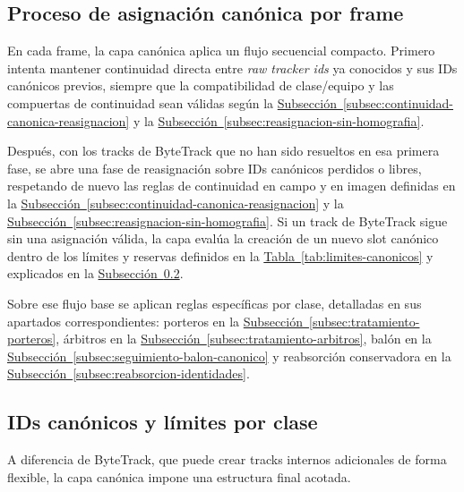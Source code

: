 \subsection{Proceso de asignación canónica por frame}

En cada frame, la capa canónica aplica un flujo secuencial compacto. Primero intenta mantener continuidad directa entre \textit{raw tracker ids} ya conocidos y sus IDs canónicos previos, siempre que la compatibilidad de clase/equipo y las compuertas de continuidad sean válidas según la \hyperref[subsec:continuidad-canonica-reasignacion]{Subsección~\ref*{subsec:continuidad-canonica-reasignacion}} y la \hyperref[subsec:reasignacion-sin-homografia]{Subsección~\ref*{subsec:reasignacion-sin-homografia}}.

Después, con los tracks de ByteTrack que no han sido resueltos en esa primera fase, se abre una fase de reasignación sobre IDs canónicos perdidos o libres, respetando de nuevo las reglas de continuidad en campo y en imagen definidas en la \hyperref[subsec:continuidad-canonica-reasignacion]{Subsección~\ref*{subsec:continuidad-canonica-reasignacion}} y la \hyperref[subsec:reasignacion-sin-homografia]{Subsección~\ref*{subsec:reasignacion-sin-homografia}}.
Si un track de ByteTrack sigue sin una asignación válida, la capa evalúa la creación de un nuevo slot canónico dentro de los límites y reservas definidos en la \hyperref[tab:limites-canonicos]{Tabla~\ref*{tab:limites-canonicos}} y explicados en la \hyperref[subsec:ids-canonicos-limites]{Subsección~\ref*{subsec:ids-canonicos-limites}}.

Sobre ese flujo base se aplican reglas específicas por clase, detalladas en sus apartados correspondientes: porteros en la \hyperref[subsec:tratamiento-porteros]{Subsección~\ref*{subsec:tratamiento-porteros}}, árbitros en la \hyperref[subsec:tratamiento-arbitros]{Subsección~\ref*{subsec:tratamiento-arbitros}}, balón en la \hyperref[subsec:seguimiento-balon-canonico]{Subsección~\ref*{subsec:seguimiento-balon-canonico}} y reabsorción conservadora en la \hyperref[subsec:reabsorcion-identidades]{Subsección~\ref*{subsec:reabsorcion-identidades}}.

\subsection{IDs canónicos y límites por clase}
\label{subsec:ids-canonicos-limites}

A diferencia de ByteTrack, que puede crear tracks internos adicionales de forma flexible, la capa canónica impone una estructura final acotada.

